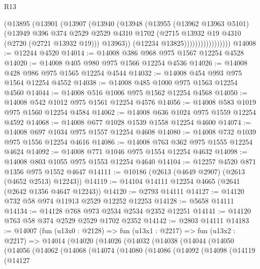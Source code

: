 \begin{lexlean}{R13}
\begin{coremodule}
                          (@13895
                            (@13901
                              (@13907
                                (@13940
                                  (@13948
                                    (@13955
                                      (@13962 @13963 @5101)
                                      (@13949
                                        @396
                                        @374
                                        @2529
                                        @2529
                                        @4310
                                        @1702
                                        (@2715 @13932 @19 @4310 (@2720 (@2721 @13932 @19)))
                                        @13963))
                                    (@12234 @13825)))))))))))))))))
@14008 := @12244 @4520
@14014 := @14008 @386 @968 @975 @1567 @12254 @4528
@14020 := @14008 @405 @980 @975 @1566 @12254 @4536
@14026 := @14008 @428 @986 @975 @1565 @12254 @4544
@14032 := @14008 @454 @993 @975 @1564 @12254 @4552
@14038 := @14008 @485 @1000 @975 @1563 @12254 @4560
@14044 := @14008 @516 @1006 @975 @1562 @12254 @4568
@14050 := @14008 @542 @1012 @975 @1561 @12254 @4576
@14056 := @14008 @583 @1019 @975 @1560 @12254 @4584
@14062 := @14008 @636 @1024 @975 @1559 @12254 @4592
@14068 := @14008 @677 @1028 @1539 @1558 @12254 @4600
@14074 := @14008 @697 @1034 @975 @1557 @12254 @4608
@14080 := @14008 @732 @1039 @975 @1556 @12254 @4616
@14086 := @14008 @763 @362 @975 @1555 @12254 @4624
@14092 := @14008 @771 @1046 @975 @1554 @12254 @4632
@14098 := @14008 @803 @1055 @975 @1553 @12254 @4640
@14104 := @12257 @4520 @871 @1356 @975 @1552 @4647
@14111 := @10186 (@2613 (@4649 @2907) (@2613 (@4652 @2513) @12243))
@14119 := @14104 @14111 @12254 @4665 (@2641 (@2642 @1356 @4647 @12243))
@14120 := @2793 @14111
@14127 := @14120 @732 @58 @974 @11913 @2529 @12252 @12253
@14128 := @5658 @14111
@14134 := @14128 @768 @973 @2534 @2534 @2352 @12251
@14141 := @14120 @763 @58 @374 @2529 @2529 @1702 @2352
@14142 := @2803 @14111
@14183 := @14007
    (fun (u13x0 : @2128) =>
    fun (u13x1 : @2217) =>
    fun (u13x2 : @2217) =>
    @14014
      (@14020
        (@14026
          (@14032
            (@14038
              (@14044
                (@14050
                  (@14056
                    (@14062
                      (@14068
                        (@14074
                          (@14080
                            (@14086
                              (@14092
                                (@14098
                                  (@14119
                                    (@14127

\end{coremodule}
\end{lexlean}
